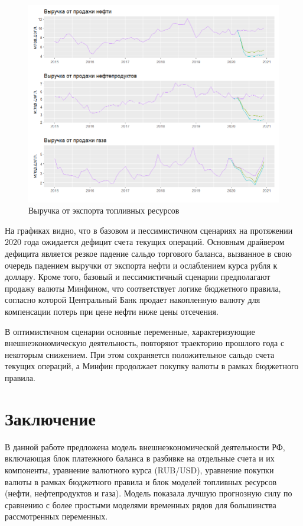 \documentclass[a4paper, 14pt]{extarticle}
\begin{document}
\begin{figure}[htp]
	\centering
	\includegraphics[width=18cm]{fuels_2015.png}
	\caption{Выручка от экспорта топливных ресурсов}\label{fi:9}
\end{figure}

\newpage

На графиках видно, что в базовом и пессимистичном сценариях на протяжении $2020$ года ожидается дефицит счета текущих операций.
Основным драйвером дефицита является резкое падение сальдо торгового баланса, вызванное в свою очередь падением выручки от экспорта нефти и ослаблением курса рубля к доллару.
Кроме того, базовый и пессимистичный сценарии предполагают продажу валюты Минфином, что соответствует логике бюджетного правила, согласно которой Центральный Банк продает накопленную валюту для компенсации потерь при цене нефти ниже цены отсечения.

В оптимистичном сценарии основные переменные, характеризующие внешнеэкономическую деятельность, повторяют траекторию прошлого года с некоторым снижением. 
При этом сохраняется положительное сальдо счета текущих операций, а Минфин продолжает покупку валюты в рамках бюджетного правила.

\newpage
\section{Заключение}

В данной работе предложена модель внешнеэкономической деятельности РФ, включающая блок платежного баланса в разбивке на отдельные счета и их компоненты, уравнение валютного курса (RUB/USD), уравнение покупки валюты в рамках бюджетного правила и блок моделей топливных ресурсов (нефти, нефтепродуктов и газа).
Модель показала лучшую прогнозную силу по сравнению с более простыми моделями временных рядов для большинства рассмотренных переменных.
\end{document}
